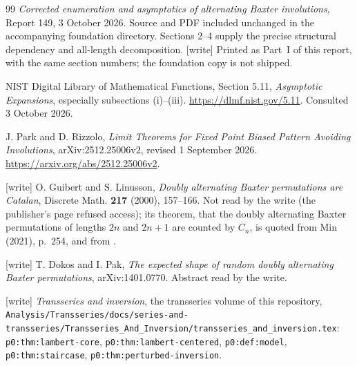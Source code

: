 \documentclass[11pt,letterpaper]{article}
\numberwithin{equation}{section}
\theoremstyle{remark}\newtheorem{remark}[theorem]{Remark}
\newcommand{\file}[1]{\nolinkurl{#1}}
\begin{document}
\begin{thebibliography}{99}
\emph{Corrected enumeration and asymptotics of alternating Baxter
involutions}, Report 149, 3 October 2026. Source and PDF included
unchanged in the accompanying foundation directory. Sections 2--4
supply the precise structural dependency and all-length decomposition.
\textup{[write] Printed as Part~I of this report, with the same section numbers; the foundation copy is not shipped.}

NIST Digital Library of Mathematical Functions, Section 5.11,
\emph{Asymptotic Expansions}, especially subsections (i)--(iii).
\url{https://dlmf.nist.gov/5.11}. Consulted 3 October 2026.

J. Park and D. Rizzolo, \emph{Limit Theorems for Fixed Point Biased
Pattern Avoiding Involutions}, arXiv:2512.25006v2, revised
1 September 2026. \url{https://arxiv.org/abs/2512.25006v2}.

\textup{[write]} O. Guibert and S. Linusson, \emph{Doubly alternating Baxter permutations are Catalan}, Discrete Math. \textbf{217} (2000), 157--166. Not read by the write (the publisher's page refused access); its theorem, that the doubly alternating Baxter permutations of lengths $2n$ and $2n+1$ are counted by $C_n$, is quoted from Min (2021), p.~254, and from \cite{DP}.

\textup{[write]} T. Dokos and I. Pak, \emph{The expected shape of random doubly alternating Baxter permutations}, arXiv:1401.0770. Abstract read by the write.

\textup{[write]} \emph{Transseries and inversion}, the transseries volume of this repository, \file{Analysis/Transseries/docs/series-and-transseries/Transseries_And_Inversion/transseries_and_inversion.tex}: \texttt{p0:thm:lambert-core}, \texttt{p0:thm:lambert-centered}, \texttt{p0:def:model}, \texttt{p0:thm:staircase}, \texttt{p0:thm:perturbed-inversion}.
\end{thebibliography}
\end{document}
